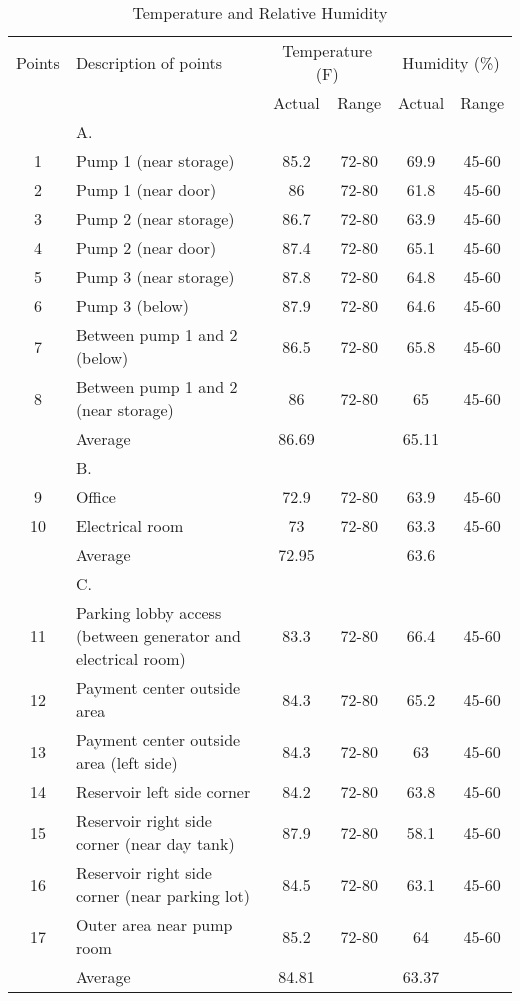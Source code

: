 \begin{table}
	\caption{Temperature and Relative Humidity}
	\label{ch047_tdb_rh}

	{\footnotesize

\begin{tabular}{c|p{7cm}|c|c|c|c}
\hline
Points & Description of points & \multicolumn{2}{c|}{Temperature (F)} & \multicolumn{2}{c}{Humidity (\%)} \\ 
\cline{3-6}
 &  & Actual & Range & Actual & Range \\ 
\hline
 & A. &  &  &  &  \\ 
1 & Pump 1  (near storage) & 85.2 & 72-80 & 69.9 & 45-60 \\ 
2 & Pump 1  (near door) & 86 & 72-80 & 61.8 & 45-60 \\ 
3 & Pump 2 (near storage) & 86.7 & 72-80 & 63.9 & 45-60 \\ 
4 & Pump 2  (near door) & 87.4 & 72-80 & 65.1 & 45-60 \\ 
5 & Pump 3  (near storage) & 87.8 & 72-80 & 64.8 & 45-60 \\ 
6 & Pump 3 (below) & 87.9 & 72-80 & 64.6 & 45-60 \\ 
7 & Between pump 1 and 2 (below) & 86.5 & 72-80 & 65.8 & 45-60 \\ 
8 & Between pump 1 and 2 (near storage) & 86 & 72-80 & 65 & 45-60 \\ 
 & Average & 86.69 &  & 65.11 &  \\ 
\hline
 & B. &  &  &  &  \\ 
9 & Office & 72.9 & 72-80 & 63.9 & 45-60 \\ 
10 & Electrical room & 73 & 72-80 & 63.3 & 45-60 \\ 
 & Average & 72.95 &  & 63.6 &  \\ 
\hline
 & C. &  &  &  &  \\ 
11 & Parking lobby access (between generator and electrical room) & 83.3 & 72-80 & 66.4 & 45-60 \\ 
12 & Payment center outside area & 84.3 & 72-80 & 65.2 & 45-60 \\ 
13 & Payment center outside area (left side) & 84.3 & 72-80 & 63 & 45-60 \\ 
14 & Reservoir left side corner & 84.2 & 72-80 & 63.8 & 45-60 \\ 
15 & Reservoir right side corner (near day tank) & 87.9 & 72-80 & 58.1 & 45-60 \\ 
16 & Reservoir right side corner (near parking lot) & 84.5 & 72-80 & 63.1 & 45-60 \\ 
17 & Outer area near pump room & 85.2 & 72-80 & 64 & 45-60 \\ 
 & Average & 84.81 &  & 63.37 &  \\ 
\hline

\end{tabular}
}
\end{table}